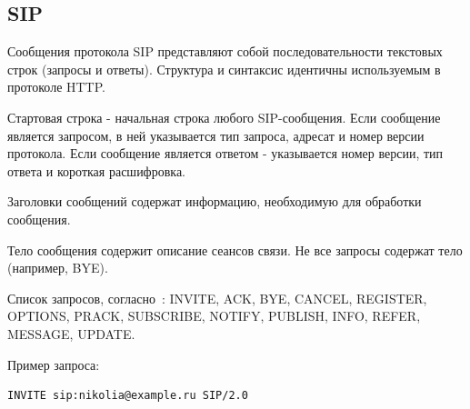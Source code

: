 \subsection{SIP}
Сообщения протокола SIP представляют собой последовательности текстовых строк (запросы и ответы). Структура и синтаксис идентичны используемым в протоколе HTTP.

Стартовая строка - начальная строка любого SIP-сообщения. Если сообщение является запросом, в ней указывается тип запроса, адресат и номер версии протокола. Если сообщение является ответом - указывается номер версии, тип ответа и короткая расшифровка.

Заголовки сообщений содержат информацию, необходимую для обработки сообщения.

Тело сообщения содержит описание сеансов связи. Не все запросы содержат тело (например, BYE).

Список запросов, согласно~\cite{sip_rfc}: INVITE, ACK, BYE, CANCEL, REGISTER, OPTIONS, PRACK, SUBSCRIBE, NOTIFY, PUBLISH, INFO, REFER, MESSAGE, UPDATE.

Пример запроса:
\begin{lstlisting}
INVITE sip:nikolia@example.ru SIP/2.0
\end{lstlisting}

